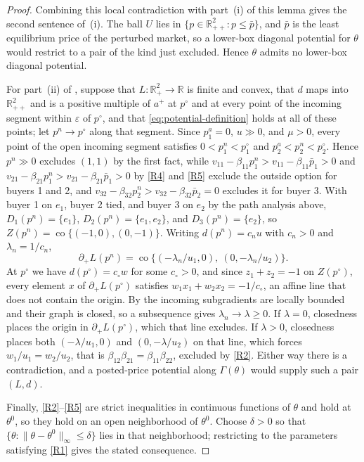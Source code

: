\documentclass[11pt,a4paper,fleqn]{article}
\theoremstyle{plain}
\theoremstyle{definition}
\newcommand{\R}{\mathbb{R}}
\newcommand{\co}{\operatorname{co}}
\newcommand{\eps}{\varepsilon}
\begin{document}
\begin{proof}
Combining this local contradiction with part~\textup{(i)} of this lemma gives the second sentence of \,(i). The ball $U$ lies in $\{p\in\R_{++}^2:p\le\bar p\}$, and $\bar p$ is the least equilibrium price of the perturbed market, so a lower-box diagonal potential for $\theta$ would restrict to a pair of the kind just excluded. Hence $\theta$ admits no lower-box diagonal potential.

For part~(ii) of , suppose that $L:\R_+^2\to\R$ is finite and convex, that $d$ maps into $\R_{++}^2$ and is a positive multiple of $a^+$ at $p^\circ$ and at every point of the incoming segment within $\eps$ of $p^\circ$, and that \eqref{eq:potential-definition} holds at all of these points; let $p^n\to p^\circ$ along that segment. Since $p^a_1=0$, $u\gg0$, and $\mu>0$, every point of the open incoming segment satisfies $0<p^n_1<p^\circ_1$ and $p^a_2<p^n_2<p^\circ_2$. Hence $p^n\gg0$ excludes $(1,1)$ by the first fact, while $v_{11}-\beta_{11}p^n_1>v_{11}-\beta_{11}\bar p_1>0$ and $v_{21}-\beta_{21}p^n_1>v_{21}-\beta_{21}\bar p_1>0$ by \ref{R4} and \ref{R5} exclude the outside option for buyers 1 and 2, and $v_{32}-\beta_{32}p^n_2>v_{32}-\beta_{32}\bar p_2=0$ excludes it for buyer 3. With buyer 1 on $e_1$, buyer 2 tied, and buyer 3 on $e_2$ by the path analysis above, $D_1(p^n)=\{e_1\}$, $D_2(p^n)=\{e_1,e_2\}$, and $D_3(p^n)=\{e_2\}$, so $Z(p^n)=\co\{(-1,0),(0,-1)\}$. Writing $d(p^n)=c_nu$ with $c_n>0$ and $\lambda_n=1/c_n$,
\[
\partial_+L(p^n)=\co\{(-\lambda_n/u_1,0),\ (0,-\lambda_n/u_2)\}.
\]
At $p^\circ$ we have $d(p^\circ)=c_\circ w$ for some $c_\circ>0$, and since $z_1+z_2=-1$ on $Z(p^\circ)$, every element $x$ of $\partial_+L(p^\circ)$ satisfies $w_1x_1+w_2x_2=-1/c_\circ$, an affine line that does not contain the origin. By  the incoming subgradients are locally bounded and their graph is closed, so a subsequence gives $\lambda_n\to\lambda\ge0$. If $\lambda=0$, closedness places the origin in $\partial_+L(p^\circ)$, which that line excludes. If $\lambda>0$, closedness places both $(-\lambda/u_1,0)$ and $(0,-\lambda/u_2)$ on that line, which forces $w_1/u_1=w_2/u_2$, that is $\beta_{12}\beta_{21}=\beta_{11}\beta_{22}$, excluded by \ref{R2}. Either way there is a contradiction, and a posted-price potential along $\Gamma(\theta)$ would supply such a pair $(L,d)$.

Finally, \ref{R2}--\ref{R5} are strict inequalities in continuous functions of $\theta$ and hold at $\theta^0$, so they hold on an open neighborhood of $\theta^0$. Choose $\delta>0$ so that $\{\theta:\lVert\theta-\theta^0\rVert_\infty\le\delta\}$ lies in that neighborhood; restricting to the parameters satisfying \ref{R1} gives the stated consequence.
\end{proof}
\end{document}
